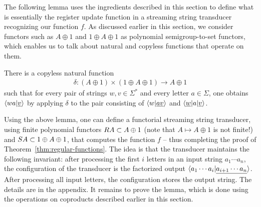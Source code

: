 The following lemma uses the ingredients described in this section to define what is essentially the register update function in a streaming string transducer recognizing our function $f$.  As discussed earlier in this section, we consider functors such as $A \oplus 1$ and $1 \oplus A \oplus 1$ as polynomial semigroup-to-set functors, which enables us to talk about natural and copyless functions that operate on them.
\begin{lemma}\label{lem:compute-next-configuration}
    There is a {copyless} natural function
    \begin{align*}
    \delta\colon (A \oplus 1) \times (1 \oplus A \oplus 1) \to A \oplus 1
    \end{align*} 
    such that for every pair of strings $w,v \in \Sigma^*$ and every letter $a \in \Sigma$, one obtains $\langle wa|\underline v \rangle$ by applying $\delta$ to the pair  consisting of  $\langle w|\underline {av} \rangle$ and $\langle \underline w | a|\underline v \rangle$.
    \end{lemma}
    Using the above lemma, one can define a functorial streaming string transducer, using finite polynomial functors $\functorr A \subset A \oplus 1$ (note that $A \mapsto A \oplus 1$ is not finite!) and $\functors A \subset 1 \oplus A \oplus 1$, that computes the function $f$ -- thus completing the proof of Theorem~\ref{thm:regular-functions}. The idea is that the transducer maintains the following invariant: after processing the first $i$ letters in an input string $a_1 \cdots a_n$, the configuration of the transducer is the factorized output $\langle a_1 \cdots a_i | \underline{a_{i+1} \cdots a_n} \rangle$. After processing all input letters, the configuration stores the output string. The details are in the appendix. It remains to prove the lemma, which is done using the operations on coproducts described earlier in this section. 


